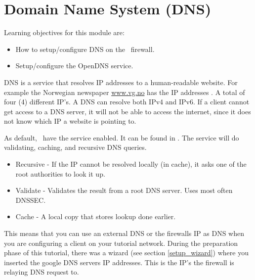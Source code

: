 \newpage

\section{Domain Name System (DNS)} \label{DNSDHCP}


Learning objectives for this module are:
\begin{itemize}
    \item How to setup/configure DNS on the \opnsense\ firewall.
    \item Setup/configure the OpenDNS service.
\end{itemize}

DNS is a service that resolves IP addresses to a human-readable website. For example the Norwegian newspaper \url{www.vg.no} has the IP addresses . A total of four (4) different IP's. A DNS can resolve both IPv4 and IPv6. If a client cannot get access to a DNS server, it will not be able to access the internet, since it does not know which IP a website is pointing to. 


As default, \opnsense\ have the  service enabled. It can be found in . The  service will do validating, caching, and recursive DNS queries.

\begin{itemize}
    \item Recursive - If the IP cannot be resolved locally (in cache), it asks one of the root authorities to look it up.
    \item Validate - Validates the result from a root DNS server. Uses most often DNSSEC.
    \item Cache - A local copy that stores lookup done earlier.
\end{itemize}

This means that you can use an external DNS or the firewalls IP as DNS when you are configuring a client on your tutorial network. During the preparation phase of this tutorial, there was a wizard (see section \ref{setup_wizard}) where you inserted the google DNS servers IP addresses. This is the IP's the firewall is relaying DNS request to.

